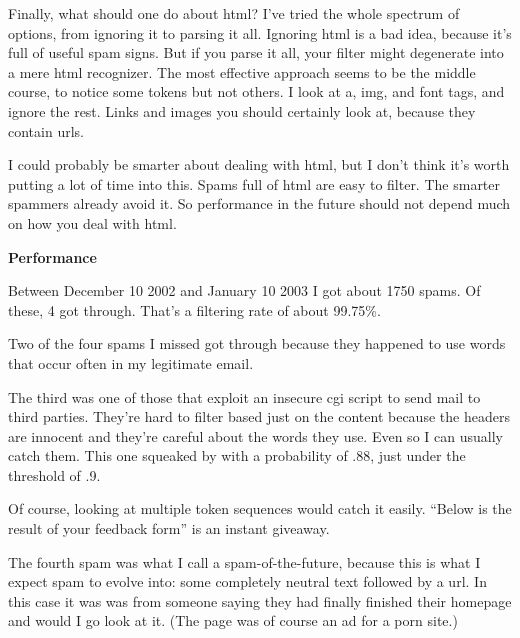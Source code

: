 Finally,
                  what should one do about html? I've tried the whole spectrum
                  of options, from ignoring it to parsing it all. Ignoring html
                  is a bad idea, because it's full of useful spam signs. But if
                  you parse it all, your filter might degenerate into a mere
                  html recognizer. The most effective approach seems to be the
                  middle course, to notice some tokens but not others. I look at
                  a, img, and font tags, and ignore the rest. Links and images
                  you should certainly look at, because they contain urls.

I
                  could probably be smarter about dealing with html, but I don't
                  think it's worth putting a lot of time into this. Spams full
                  of html are easy to filter. The smarter spammers already avoid
                  it. So performance in the future should not depend much on how
                  you deal with html.

\textbf{Performance}

Between December 10 2002 and January 10 2003 I
                  got about 1750 spams. Of these, 4 got through. That's a
                  filtering rate of about 99.75\%.

Two of the four
                  spams I missed got through because they happened to use words
                  that occur often in my legitimate email.

The third
                  was one of those that exploit an insecure cgi script to send
                  mail to third parties. They're hard to filter based just on
                  the content because the headers are innocent and they're
                  careful about the words they use. Even so I can usually catch
                  them. This one squeaked by with a probability of .88, just
                  under the threshold of .9.

Of course, looking at
                  multiple token sequences would catch it easily. ``Below is the
                  result of your feedback form'' is an instant giveaway.

The
                  fourth spam was what I call a spam-of-the-future, because this
                  is what I expect spam to evolve into: some completely neutral
                  text followed by a url. In this case it was was from someone
                  saying they had finally finished their homepage and would I go
                  look at it. (The page was of course an ad for a porn site.)

